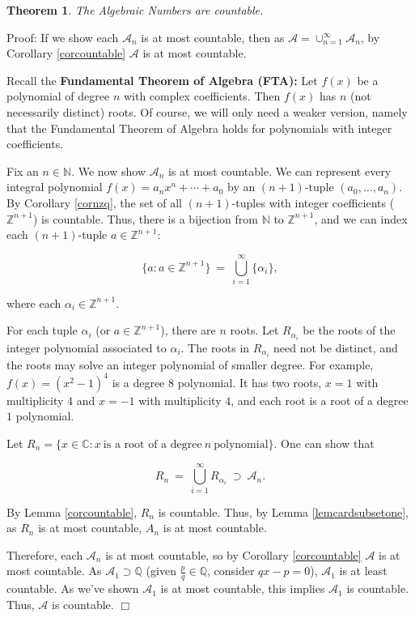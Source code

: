 \documentclass[12pt,letterpaper]{report}
\newcommand\be{\begin{equation}}
\newcommand\ee{\end{equation}}
\newcommand{\C}{\ensuremath{\mathbb{C}}}
\newcommand{\Z}{\ensuremath{\mathbb{Z}}}
\newcommand{\Q}{\mathbb{Q}}
\newcommand{\N}{\mathbb{N}}
\newtheorem{thm}{Theorem}[section]
\begin{document}
\begin{thm} The Algebraic Numbers are countable. \end{thm}

Proof: If we show each $\mathcal{A}_n$ is at most countable, then
as $\mathcal{A} = \cup_{n=1}^\infty \mathcal{A}_n$, by Corollary
\ref{corcountable} $\mathcal{A}$ is at most countable.

Recall the \textbf{Fundamental Theorem of Algebra (FTA):} Let
$f(x)$ be a polynomial of degree $n$ with complex coefficients.
Then $f(x)$ has $n$ (not necessarily distinct) roots. Of course,
we will only need a weaker version, namely that the Fundamental
Theorem of Algebra holds for polynomials with integer
coefficients.

Fix an $n \in \N$. We now show $\mathcal{A}_n$ is at most
countable. We can represent every integral polynomial $f(x) = a_n
x^n + \cdots + a_0$ by an $(n+1)$-tuple $(a_0,\dots,a_n)$. By
Corollary \ref{cornzq}, the set of all $(n+1)$-tuples with integer
coefficients ($\Z^{n+1}$) is countable. Thus, there is a bijection
from $\N$ to $\Z^{n+1}$, and we can index each $(n+1)$-tuple $a
\in \Z^{n+1}$:

\be \{a: a \in \Z^{n+1}\} \ = \ \bigcup_{i=1}^\infty \{ \alpha_i
\}, \ee

where each $\alpha_i \in \Z^{n+1}$.

For each tuple $\alpha_i$ (or $a \in \Z^{n+1}$), there are $n$
roots. Let $R_{\alpha_i}$ be the roots of the integer polynomial
associated to $\alpha_i$. The roots in $R_{\alpha_i}$ need not be
distinct, and the roots may solve an integer polynomial of smaller
degree. For example, $f(x) = (x^2 - 1)^4$ is a degree $8$
polynomial. It has two roots, $x = 1$ with multiplicity $4$ and $x
= -1$ with multiplicity $4$, and each root is a root of a degree
$1$ polynomial.

Let $R_n = \{x \in \C: x\ \mbox{is a root of a degree} \ n \
\mbox{polynomial}\}$. One can show that

\be R_n \ = \ \bigcup_{i=1}^\infty R_{\alpha_i} \ \supset \
\mathcal{A}_n. \ee

By Lemma \ref{corcountable}, $R_n$ is countable. Thus, by Lemma
\ref{lemcardsubsetone}, as $R_n$ is at most countable,  $A_n$ is
at most countable.

Therefore, each $\mathcal{A}_n$ is at most countable, so by
Corollary \ref{corcountable} $\mathcal{A}$ is at most countable.
As $\mathcal{A}_1 \supset \Q$ (given $\frac{p}{q} \in \Q$,
consider $qx - p = 0$), $\mathcal{A}_1$ is at least countable. As
we've shown $\mathcal{A}_1$ is at most countable, this implies
$\mathcal{A}_1$ is countable. Thus, $\mathcal{A}$ is countable.
$\Box$
\end{document}
